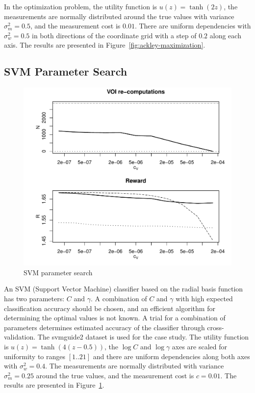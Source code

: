 In the optimization problem, the utility function is
$u(z)=\tanh(2z)$, the measurements are normally distributed around the
true values with variance $\sigma_m^2=0.5$, and the measurement cost is
$0.01$. There are uniform dependencies with $\sigma_w^2=0.5$ in both
directions of the coordinate grid with a step of $0.2$ along each axis.
The results are presented in Figure~\ref{fig:ackley-maximization}.

\subsection{SVM Parameter Search}
\label{sec:raticomp-svm}

\begin{figure}[h]
\centering
\includegraphics[scale=0.63]{raticomp-svmguide2.pdf}
\caption{SVM parameter search}
\label{fig:svmguide2}
\end{figure}
An SVM (Support Vector Machine) classifier based on the radial basis
function has two parameters: $C$ and $\gamma$.  A combination of $C$
and $\gamma$ with high expected classification accuracy should be
chosen, and an efficient algorithm for determining the optimal values
is not known. A trial for a combination of parameters determines
estimated accuracy of the classifier through cross-validation. The
{\sc svmguide2} \cite{Hsu.dataset} dataset is used for the case study.
The utility function is $u(z)=\tanh(4(z-0.5))$, the $\log C$ and $\log
\gamma$ axes are scaled for uniformity to ranges $[1..21]$ and there
are uniform dependencies along both axes with $\sigma_w^2=0.4$. The
measurements are normally distributed with variance $\sigma_m^2=0.25$
around the true values, and the measurement cost is $c=0.01$.
The results are presented in Figure~\ref{fig:svmguide2}.

